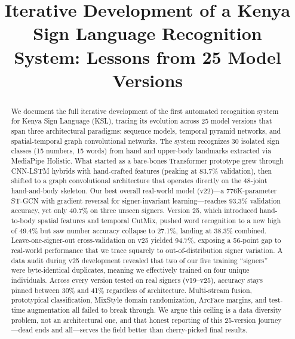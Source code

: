\documentclass[conference]{IEEEtran}
\begin{document}
\title{Iterative Development of a Kenya Sign Language Recognition System: Lessons from 25 Model Versions}

\author{
}

\maketitle

\begin{abstract}
We document the full iterative development of the first automated recognition system for Kenya Sign Language (KSL), tracing its evolution across 25 model versions that span three architectural paradigms: sequence models, temporal pyramid networks, and spatial-temporal graph convolutional networks. The system recognizes 30 isolated sign classes (15 numbers, 15 words) from hand and upper-body landmarks extracted via MediaPipe Holistic. What started as a bare-bones Transformer prototype grew through CNN-LSTM hybrids with hand-crafted features (peaking at 83.7\% validation), then shifted to a graph convolutional architecture that operates directly on the 48-joint hand-and-body skeleton. Our best overall real-world model (v22)---a 776K-parameter ST-GCN with gradient reversal for signer-invariant learning---reaches 93.3\% validation accuracy, yet only 40.7\% on three unseen signers. Version 25, which introduced hand-to-body spatial features and temporal CutMix, pushed word recognition to a new high of 49.4\% but saw number accuracy collapse to 27.1\%, landing at 38.3\% combined. Leave-one-signer-out cross-validation on v25 yielded 94.7\%, exposing a 56-point gap to real-world performance that we trace squarely to out-of-distribution signer variation. A data audit during v25 development revealed that two of our five training ``signers'' were byte-identical duplicates, meaning we effectively trained on four unique individuals. Across every version tested on real signers (v19--v25), accuracy stays pinned between 30\% and 41\% regardless of architecture. Multi-stream fusion, prototypical classification, MixStyle domain randomization, ArcFace margins, and test-time augmentation all failed to break through. We argue this ceiling is a data diversity problem, not an architectural one, and that honest reporting of this 25-version journey---dead ends and all---serves the field better than cherry-picked final results.
\end{abstract}
\end{document}
